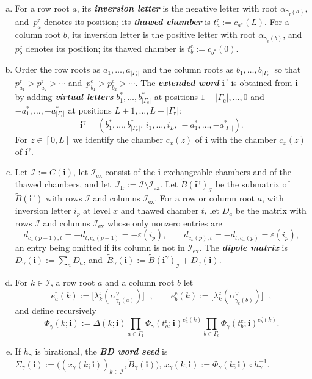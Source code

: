 \documentclass[a4paper]{amsart}
\numberwithin{equation}{section}
\theoremstyle{definition}
\theoremstyle{remark}
\newcommand{\mcI}{\mathcal{I}}
\newcommand{\bfi}{\mathbf{i}}
\newcommand{\tB}{\widetilde{B}}
\newcommand{\rr}{\mathrm{r}}
\newcommand{\cc}{\mathrm{c}}
\newcommand{\ex}{\mathrm{ex}}
\newcommand{\fr}{\mathrm{fr}}
\newcommand{\newword}[1]{\textbf{\emph{#1}}}
\begin{document}
\begin{definition}
  \label{def: BD word seed}
  \begin{enumerate}[(a)]
    \item For a row root $a$, its \newword{inversion letter} is the negative letter with root $\alpha_{\gamma_{\rr}(a)}$, and~$p^\rr_a$ denotes its position; its \newword{thawed chamber} is $t^\rr_a:=c_{a^*}(L)$.
      For a column root $b$, its inversion letter is the positive letter with root $\alpha_{\gamma_{\cc}(b)}$, and $p^\cc_b$ denotes its position; its thawed chamber is $t^\cc_b:=c_{b^*}(0)$.
    \item Order the row roots as $a_1,\dots,a_{|\Gamma_{\rr}|}$ and the column roots as $b_1,\dots,b_{|\Gamma_{\cc}|}$ so that $p^\rr_{a_1}>p^\rr_{a_2}>\cdots$ and~$p^\cc_{b_1}>p^\cc_{b_2}>\cdots$.
      The \newword{extended word} $\bfi^\gamma$ is obtained from $\bfi$ by adding \newword{virtual letters} $b_1^*,\dots,b_{|\Gamma_{\cc}|}^*$ at positions $1-|\Gamma_{\cc}|,\dots,0$ and $-a_1^*,\dots,-a_{|\Gamma_{\rr}|}^*$ at positions $L+1,\dots,L+|\Gamma_{\rr}|$:
      \[
        \bfi^\gamma=(b_1^*,\dots,b_{|\Gamma_{\cc}|}^*,\,i_1,\dots,i_L,\,-a_1^*,\dots,-a_{|\Gamma_{\rr}|}^*).
      \]
      For $z\in[0,L]$ we identify the chamber $c_x(z)$ of $\bfi$ with the chamber $c_x(z)$ of $\bfi^\gamma$.
    \item Let $\mcI:=C(\bfi)$, let $\mcI_\ex$ consist of the $\bfi$-exchangeable chambers and of the thawed chambers, and let~$\mcI_\fr:=\mcI\setminus\mcI_\ex$.
      Let $\tB(\bfi^\gamma)_\mcI$ be the submatrix of $\tB(\bfi^\gamma)$ with rows $\mcI$ and columns $\mcI_\ex$.
      For a row or column root $a$, with inversion letter $i_p$ at level $x$ and thawed chamber $t$, let $D_a$ be the matrix with rows $\mcI$ and columns $\mcI_\ex$ whose only nonzero entries are
      \[
        d_{c_x(p-1),t}=-d_{t,c_x(p-1)}=-\varepsilon(i_p),
        \qquad
        d_{c_x(p),t}=-d_{t,c_x(p)}=\varepsilon(i_p),
      \]
      an entry being omitted if its column is not in $\mcI_\ex$.
      The \newword{dipole matrix} is $D_\gamma(\bfi):=\sum_aD_a$, and~$\tB_\gamma(\bfi):=\tB(\bfi^\gamma)_\mcI+D_\gamma(\bfi)$.
    \item For $k\in\mcI$, a row root $a$ and a column root $b$ let
      \[
        e^\rr_a(k):=\big[\lambda^\rr_k(\alpha^\vee_{\gamma_{\rr}(a)})\big]_+,
        \qquad
        e^\cc_b(k):=\big[\lambda^\cc_k(\alpha^\vee_{\gamma_{\cc}(b)})\big]_+,
      \]
      and define recursively
      \begin{equation}
        \label{eq: Phi}
        \Phi_\gamma(k;\bfi):=\Delta(k;\bfi)\prod_{a\in\Gamma_{\rr}}\Phi_\gamma(t^\rr_a;\bfi)^{e^\rr_a(k)}\prod_{b\in\Gamma_{\cc}}\Phi_\gamma(t^\cc_b;\bfi)^{e^\cc_b(k)}.
      \end{equation}
    \item If $h_\gamma$ is birational, the \newword{BD word seed} is $\Sigma_\gamma(\bfi):=\big((x_\gamma(k;\bfi))_{k\in\mcI},\tB_\gamma(\bfi)\big)$, $x_\gamma(k;\bfi):=\Phi_\gamma(k;\bfi)\circ h_\gamma^{-1}$.
  \end{enumerate}
\end{definition}
\end{document}
